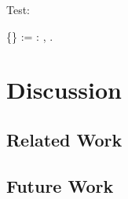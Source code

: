 \documentclass[sigplan,10pt,anonymous,review]{acmart}\settopmatter{printfolios=true,printccs=false,printacmref=false}
\begin{document}
Test:

\begin{coqdoccode}
  \coqdocnoindent
  \Definition{}  \{\}   := \Math\forall {}: ,   \Math\leftrightarrow{}  .\coqdoceol
  \coqdocemptyline
\end{coqdoccode}


\section{Discussion}
\subsection{Related Work}
\subsection{Future Work}







\appendix
\end{document}
